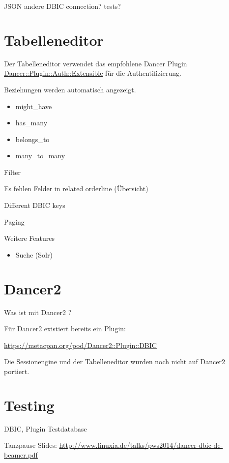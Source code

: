 JSON
andere DBIC connection?
tests?

\section{Tabelleneditor}

Der Tabelleneditor verwendet das empfohlene Dancer Plugin
\href{https://metacpan.org/pod/Dancer::Plugin::Auth::Extensible}{Dancer::Plugin::Auth::Extensible}
für die Authentifizierung.

Beziehungen werden automatisch angezeigt.

\begin{itemize}
\item might\_have
\item has\_many
\item belongs\_to
\item many\_to\_many
\end{itemize}

Filter

Es fehlen Felder in related orderline (Übersicht)

Different DBIC keys

Paging

\begin{frame}{Weitere Features}
\begin{itemize}
\item Suche (Solr)
\end{itemize}
\end{frame}

\section{Dancer2}

Was ist mit Dancer2 ?

Für Dancer2 existiert bereits ein Plugin:

\url{https://metacpan.org/pod/Dancer2::Plugin::DBIC}

Die Sessionengine und der Tabelleneditor wurden noch nicht auf Dancer2 portiert.

\section{Testing}
DBIC, Plugin
Testdatabase

\begin{frame}{Tanzpause}
Slides:
\url{http://www.linuxia.de/talks/pws2014/dancer-dbic-de-beamer.pdf}
\end{frame}



